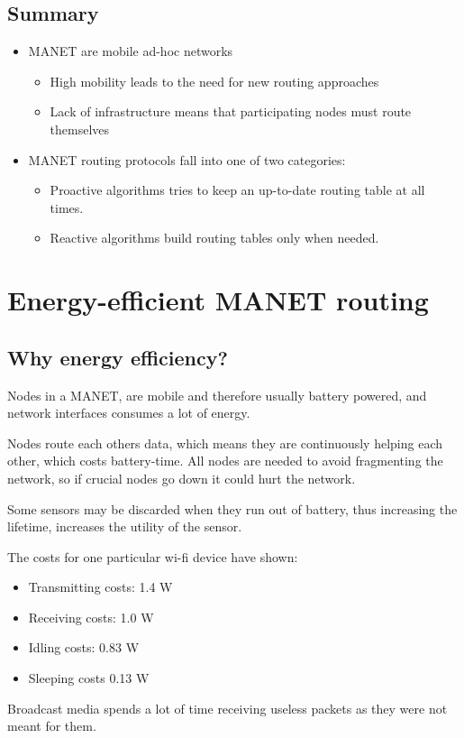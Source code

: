 	\subsection{Summary}
	\begin{itemize}
		\item \gls{MANET} are mobile ad-hoc networks
		\begin{itemize}
			\item High mobility leads to the need for new routing approaches
			\item Lack of infrastructure means that participating nodes must route themselves
		\end{itemize}
		\item \gls{MANET} routing protocols fall into one of two categories:
		\begin{itemize}
			\item Proactive algorithms tries to keep an up-to-date routing table at all times.
			\item Reactive algorithms build routing tables only when needed.
		\end{itemize}
	\end{itemize}
	
	\section{Energy-efficient MANET routing}
	
	\subsection{Why energy efficiency?}
	Nodes in a MANET, are mobile and therefore usually battery powered, and network interfaces consumes a lot of energy.
	
	Nodes route each others data, which means they are continuously helping each other, which costs battery-time. All nodes are needed to avoid fragmenting the network, so if crucial nodes go down it could hurt the network.
	
	Some sensors may be discarded when they run out of battery, thus increasing the lifetime, increases the utility of the sensor.
	
	The costs for one particular wi-fi device have shown:
	\begin{itemize}
		\item Transmitting costs: 1.4 W
		\item Receiving costs: 1.0 W
		\item Idling costs: 0.83 W
		\item Sleeping costs 0.13 W
	\end{itemize}
	Broadcast media spends a lot of time receiving useless packets as they were not meant for them.
	
